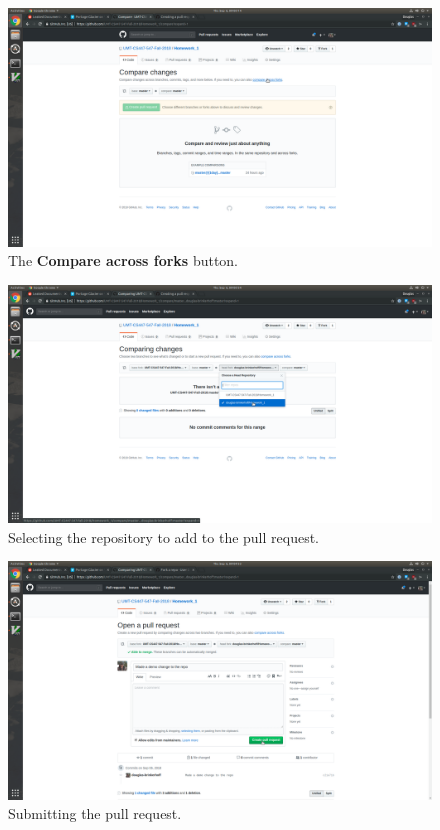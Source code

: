 \documentclass{article}
\begin{document}
\begin{figure}[h!]
\includegraphics[width=\linewidth]{pull_request_2.png}
\caption{The \textbf{Compare across forks} button.}
\end{figure}
\begin{figure}[h!]
\includegraphics[width=\linewidth]{pull_request_3.png}
\caption{Selecting the repository to add to the pull request.}
\end{figure}
\begin{figure}[h!]
\includegraphics[width=\linewidth]{pull_request_4.png}
\caption{Submitting the pull request.}
\end{figure}
\end{document}
